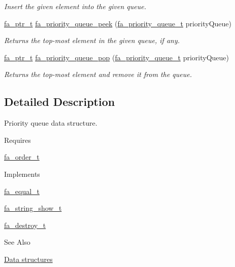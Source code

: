 \begin{DoxyCompactItemize}
\begin{DoxyCompactList}\small\item\em Insert the given element into the given queue. \end{DoxyCompactList}\item 
\hyperlink{group___fa_ga915ddeae99ad7568b273d2b876425197}{fa\-\_\-ptr\-\_\-t} \hyperlink{group___fa_priority_queue_ga07dad7064b633feff9b9f8543173dcc0}{fa\-\_\-priority\-\_\-queue\-\_\-peek} (\hyperlink{group___fa_priority_queue_ga4363f15ce2b05e7c4af410cd6509ef5a}{fa\-\_\-priority\-\_\-queue\-\_\-t} priority\-Queue)
\begin{DoxyCompactList}\small\item\em Returns the top-\/most element in the given queue, if any. \end{DoxyCompactList}\item 
\hyperlink{group___fa_ga915ddeae99ad7568b273d2b876425197}{fa\-\_\-ptr\-\_\-t} \hyperlink{group___fa_priority_queue_gac2ec9dbd70a479fd54c857f1de8d0902}{fa\-\_\-priority\-\_\-queue\-\_\-pop} (\hyperlink{group___fa_priority_queue_ga4363f15ce2b05e7c4af410cd6509ef5a}{fa\-\_\-priority\-\_\-queue\-\_\-t} priority\-Queue)
\begin{DoxyCompactList}\small\item\em Returns the top-\/most element and remove it from the queue. \end{DoxyCompactList}\end{DoxyCompactItemize}


\subsection{Detailed Description}
Priority queue data structure. \begin{DoxyParagraph}{Requires}

\begin{DoxyItemize}
\item \hyperlink{structfa__order__t}{fa\-\_\-order\-\_\-t} 
\end{DoxyItemize}
\end{DoxyParagraph}
\begin{DoxyParagraph}{Implements}

\begin{DoxyItemize}
\item \hyperlink{structfa__equal__t}{fa\-\_\-equal\-\_\-t}
\item \hyperlink{structfa__string__show__t}{fa\-\_\-string\-\_\-show\-\_\-t}
\item \hyperlink{structfa__destroy__t}{fa\-\_\-destroy\-\_\-t}
\end{DoxyItemize}
\end{DoxyParagraph}
\begin{DoxySeeAlso}{See Also}

\begin{DoxyItemize}
\item \hyperlink{md__data_structures_DataStructures}{Data structures} 
\end{DoxyItemize}
\end{DoxySeeAlso}


